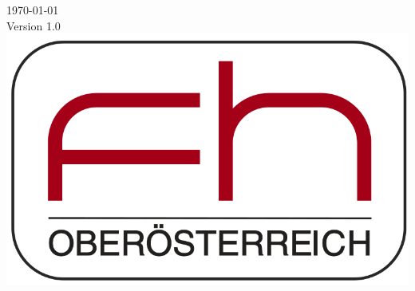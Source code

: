 \documentclass[12pt, letterpaper]{article}
\begin{document}
\begin{titlepage}


{\large \today}\\[1cm] %
{Version 1.0}\\[2cm]

\includegraphics[scale=0.25]{logo.png}
 

\vfill %

\end{titlepage}


\tableofcontents


\end{document}
